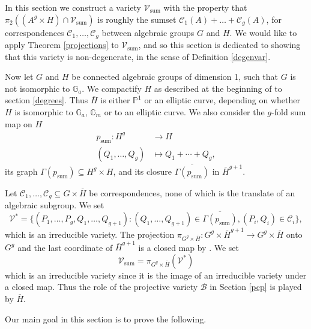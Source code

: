 \documentclass[12pt, reqno]{amsart}
\newcommand{\G}{\mathbb{G}}
\theoremstyle{remark}
\theoremstyle{definition}
\numberwithin{equation}{section}
\begin{document}
In this section we construct a variety $\mathcal{V}_{\text{sum}}$ with the property that $\pi_2((A^g \times H) \cap \mathcal{V}_{\text{sum}})$ is roughly the sumset $\mathcal{C}_1(A) + \dots + \mathcal{C}_g(A)$, for correspondences $\mathcal{C}_1, \dots, \mathcal{C}_g$ between algebraic groups $G$ and $H$. We would like to apply Theorem \ref{projections} to $\mathcal{V}_{\text{sum}}$, and so this section is dedicated to showing that this variety is non-degenerate, in the sense of Definition \ref{degenvar}.

Now let $G$ and $H$ be connected algebraic groups of dimension 1, such that $G$ is not isomorphic to $\mathbb{G}_a$. 
We compactify $H$ as described at the beginning of to section \ref{degrees}. Thus  $\overline{H}$ is either $\mathbb{P}^1$ or an elliptic curve, depending on whether $H$ is isomorphic to $\G_a$, $\G_m$ or to an elliptic curve. We also consider the $g$-fold sum map on $H$
\begin{align*}
    p_{\text{sum}}: H^g &\rightarrow H \\ (Q_1, \dots, Q_g) &\mapsto Q_1 + \cdots + Q_g,
\end{align*}
its graph $\Gamma(p_{\text{sum}}) \subseteq H^g \times H$, and its closure $\overline{\Gamma(p_{\text{sum}})}$ in $\overline{H}^{g + 1}$. 

Let $\mathcal{C}_1, \dots, \mathcal{C}_g \subseteq G \times \overline{H}$ be correspondences, none of which is the translate of an algebraic subgroup. We set 
$$ \mathcal{V}^* = \{(P_1, \dots, P_g, Q_1, \dots, Q_{g+1}): (Q_1, \dots, Q_{g+1}) \in \overline{\Gamma(p_{\text{sum}})}, (P_i, Q_i) \in \mathcal{C}_i\}, $$
which is an irreducible variety. The projection $\pi_{G^g \times \overline{H}}: G^g\times\overline{H}^{g + 1} \rightarrow G^g \times \overline{H}$ onto $G^g$ and the last coordinate of $\overline{H}^{g + 1}$ is a closed map by \cite[Theorem 1.11]{Shafarevic}. We set 
\begin{equation} \label{Vsumdef}
    \mathcal{V}_{\text{sum}} = \pi_{G^g\times\overline{H}}(\mathcal{V}^*)
\end{equation}
which is an irreducible variety since it is the image of an irreducible variety under a closed map. Thus the role of the projective variety $\mathcal{B}$ in Section \ref{pcp} is played by $\overline{H}$.

Our main goal in this section is to prove the following. 
\end{document}
